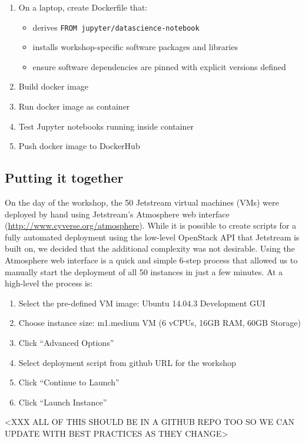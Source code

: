 \begin{enumerate}
  \item On a laptop, create Dockerfile that:
  \begin{itemize}
    \item derives \texttt{FROM jupyter/datascience-notebook}
    \item installs workshop-specific software packages and libraries
    \item ensure software dependencies are pinned with explicit versions defined
  \end{itemize}
  \item Build docker image
  \item Run docker image as container
  \item Test Jupyter notebooks running inside container
  \item Push docker image to DockerHub
\end{enumerate}


\subsection{Putting it together}

On the day of the workshop, the 50 Jetstream virtual machines (VMs) were
deployed by hand using Jetstream's Atmosphere web interface
(\url{http://www.cyverse.org/atmosphere}). While it is possible to create
scripts for a fully automated deployment using the low-level OpenStack API that
Jetstream is built on, we decided that the additional complexity was not
desirable. Using the Atmosphere web interface is a quick and simple 6-step
process that allowed us to manually start the deployment of all 50 instances in
just a few minutes. At a high-level the process is:

\begin{enumerate}
\item Select the pre-defined VM image: Ubuntu 14.04.3 Development GUI
\item Choose instance size: m1.medium VM (6 vCPUs, 16GB RAM, 60GB
  Storage)
\item Click ``Advanced Options''
\item Select deployment script from github URL for the workshop
\item Click ``Continue to Launch''
\item Click ``Launch Instance''
\end{enumerate}

<XXX ALL OF THIS SHOULD BE IN A GITHUB REPO TOO SO WE CAN UPDATE WITH BEST PRACTICES AS THEY CHANGE>

